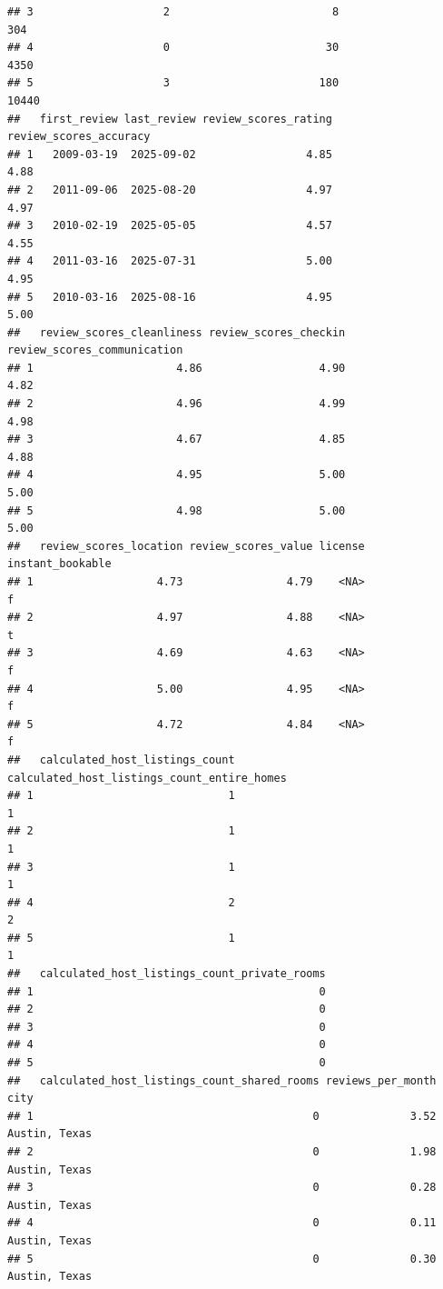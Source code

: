 \documentclass[
]{article}
\begin{document}
\begin{verbatim}
## 3                    2                         8                     304
## 4                    0                        30                    4350
## 5                    3                       180                   10440
##   first_review last_review review_scores_rating review_scores_accuracy
## 1   2009-03-19  2025-09-02                 4.85                   4.88
## 2   2011-09-06  2025-08-20                 4.97                   4.97
## 3   2010-02-19  2025-05-05                 4.57                   4.55
## 4   2011-03-16  2025-07-31                 5.00                   4.95
## 5   2010-03-16  2025-08-16                 4.95                   5.00
##   review_scores_cleanliness review_scores_checkin review_scores_communication
## 1                      4.86                  4.90                        4.82
## 2                      4.96                  4.99                        4.98
## 3                      4.67                  4.85                        4.88
## 4                      4.95                  5.00                        5.00
## 5                      4.98                  5.00                        5.00
##   review_scores_location review_scores_value license instant_bookable
## 1                   4.73                4.79    <NA>                f
## 2                   4.97                4.88    <NA>                t
## 3                   4.69                4.63    <NA>                f
## 4                   5.00                4.95    <NA>                f
## 5                   4.72                4.84    <NA>                f
##   calculated_host_listings_count calculated_host_listings_count_entire_homes
## 1                              1                                           1
## 2                              1                                           1
## 3                              1                                           1
## 4                              2                                           2
## 5                              1                                           1
##   calculated_host_listings_count_private_rooms
## 1                                            0
## 2                                            0
## 3                                            0
## 4                                            0
## 5                                            0
##   calculated_host_listings_count_shared_rooms reviews_per_month          city
## 1                                           0              3.52 Austin, Texas
## 2                                           0              1.98 Austin, Texas
## 3                                           0              0.28 Austin, Texas
## 4                                           0              0.11 Austin, Texas
## 5                                           0              0.30 Austin, Texas
\end{verbatim}
\end{document}
